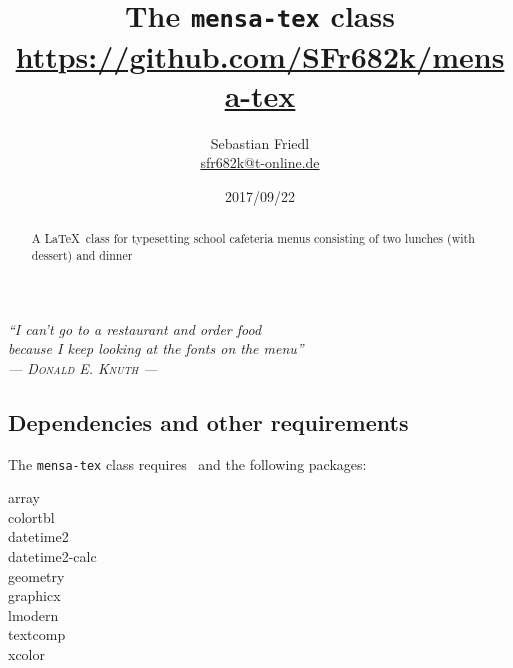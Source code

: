 \documentclass[11pt]{ltxdoc}
\title{The \texttt{mensa-tex} class \\ {\large\url{https://github.com/SFr682k/mensa-tex}}}
\author{Sebastian Friedl \\ \href{mailto:sfr682k@t-online.de}{\ttfamily sfr682k@t-online.de}}
\date{2017/09/22}
\begin{document}
	\maketitle
	\thispagestyle{empty}
	
	\begin{center} \itshape
		\enquote{I can't go to a restaurant and order food \\ because I keep looking at the fonts on the menu} \\
		--- \textsc{\upshape Donald E. Knuth} ---
	\end{center}
	
	\medskip
	\begin{abstract}
		\noindent%
		A \LaTeX\ class for typesetting school cafeteria menus consisting of two lunches (with dessert) and dinner
	\end{abstract}
	
	
	\tableofcontents
	
	\clearpage
	
	

	\subsection*{Dependencies and other requirements}
	The \texttt{mensa-tex} class requires \LaTeXe\ and the following packages:
	\begin{multicols}{3}\ttfamily\centering
		array \\ colortbl \\ datetime2 \\ datetime2-calc \\ geometry \\ graphicx \\ lmodern \\ textcomp \\ xcolor
	\end{multicols}
	
	
\end{document}
